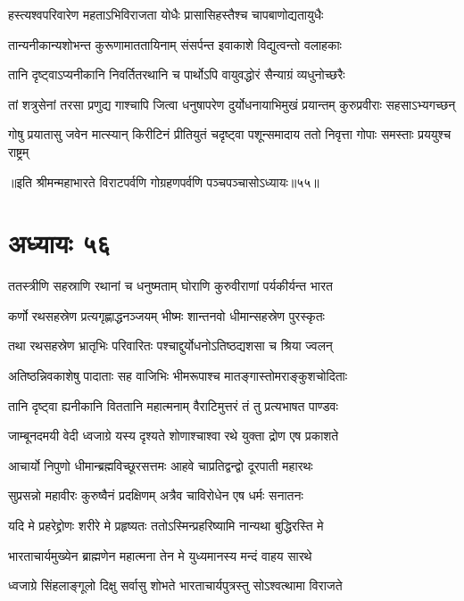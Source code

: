 \twolineshloka
{हस्त्यश्वपरिवारेण महताऽभिविराजता}
{योधैः प्रासासिहस्तैश्च चापबाणोद्यतायुधैः}


\twolineshloka
{तान्यनीकान्यशोभन्त कुरूणामाततायिनाम्}
{संसर्पन्त इवाकाशे विद्युत्वन्तो वलाहकाः}

\twolineshloka
{तानि दृष्ट्वाऽप्यनीकानि निवर्तितरथानि च}
{पार्थोऽपि वायुवद्धोरं सैन्याग्रं व्यधुनोच्छरैः}

\fourlineindentedshloka
{तां शत्रुसेनां तरसा प्रणुद्य}
{गाश्चापि जित्वा धनुषापरेण}
{दुर्योधनायाभिमुखं प्रयान्तम्}
{कुरुप्रवीराः सहसाऽभ्यगच्छन्}


\fourlineindentedshloka
{गोषु प्रयातासु जवेन मात्स्यान्}
{किरीटिनं प्रीतियुतं चदृष्ट्वा}
{पशून्समादाय ततो निवृत्ता}
{गोपाः समस्ताः प्रययुश्च राष्ट्रम्}

॥इति श्रीमन्महाभारते विराटपर्वणि गोग्रहणपर्वणि पञ्चपञ्चासोऽध्यायः॥५५॥

\chapter{अध्यायः ५६}

\twolineshloka
{ततस्त्रीणि सहस्राणि रथानां च धनुष्मताम्}
{घोराणि कुरुवीराणां पर्यकीर्यन्त भारत}


\twolineshloka
{कर्णो रथसहस्रेण प्रत्यगृह्णाद्धनञ्जयम्}
{भीष्मः शान्तनवो धीमान्सहस्रेण पुरस्कृतः}


\twolineshloka
{तथा रथसहस्रेण भ्रातृभिः परिवारितः}
{पश्चाद्दुर्योधनोऽतिष्ठद्यशसा च श्रिया ज्वलन्}


\twolineshloka
{अतिष्ठन्निवकाशेषु पादाताः सह वाजिभिः}
{भीमरूपाश्च मातङ्गास्तोमराङ्कुशचोदिताः}


\twolineshloka
{तानि दृष्ट्वा ह्यनीकानि विततानि महात्मनाम्}
{वैराटिमुत्तरं तं तु प्रत्यभाषत पाण्डवः}


\twolineshloka
{जाम्बूनदमयी वेदी ध्वजाग्रे यस्य दृश्यते}
{शोणाश्चाश्वा रथे युक्ता द्रोण एष प्रकाशते}


\twolineshloka
{आचार्यो निपुणो धीमान्ब्रह्मविच्छूरसत्तमः}
{आहवे चाप्रतिद्वन्द्वो दूरपाती महारथः}


\twolineshloka
{सुप्रसन्नो महावीरः कुरुष्वैनं प्रदक्षिणम्}
{अत्रैव चाविरोधेन एष धर्मः सनातनः}


\twolineshloka
{यदि मे प्रहरेद्द्रोणः शरीरे मे प्रहृष्यतः}
{ततोऽस्मिन्प्रहरिष्यामि नान्यथा बुद्धिरस्ति मे}


\twolineshloka
{भारताचार्यमुख्येन ब्राह्मणेन महात्मना}
{तेन मे युध्यमानस्य मन्दं वाहय सारथे}


\twolineshloka
{ध्वजाग्रे सिंहलाङ्गूलो दिक्षु सर्वासु शोभते}
{भारताचार्यपुत्रस्तु सोऽश्वत्थामा विराजते}


